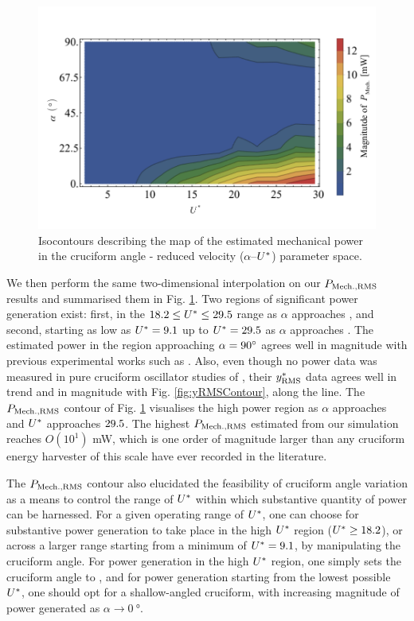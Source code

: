 \documentclass[oneside]{utmthesis}
\begin{document}
\begin{figure}
  \centering
  \includegraphics[width=1\textwidth]{figs/mechanicalPowerContours}
  \caption{Isocontours describing the map of the estimated mechanical power in the cruciform angle - reduced velocity ($\alpha$--$U^{*}$) parameter space.}
  \label{fig:mechanicalPowerContour}
\end{figure}

We then perform the same two-dimensional interpolation on our $P_{\text{Mech.,RMS}}$ results and summarised them in Fig. \ref{fig:mechanicalPowerContour}. Two regions of significant power generation exist: first, in the $18.2 \leq U^{*} \leq 29.5$ range as $\alpha$ approaches \angfi{}, and second, starting as low as $U^{*} = 9.1$ up to $U^{*} = 29.5$ as $\alpha$ approaches \angon{}. The estimated power in the region approaching $\alpha = \angfi{}$ agrees well in magnitude with previous experimental works such as \citet{Koide2013}. Also, even though no power data was measured in pure cruciform oscillator studies of \citet{Koide2009,Nguyen2012}, their $y^{*}_{\text{RMS}}$ data agrees well in trend and in magnitude with Fig. \ref{fig:yRMSContour}, along the \angfi{} line. The $P_{\text{Mech.,RMS}}$ contour of Fig. \ref{fig:mechanicalPowerContour} visualises the high power region as $\alpha$ approaches \angon{} and $U^{*}$ approaches $29.5$. The highest $P_{\text{Mech.,RMS}}$ estimated from our simulation reaches $O(10^{1})$ \si{\milli\watt}, which is one order of magnitude larger than any cruciform energy harvester of this scale have ever recorded in the literature.

The $P_{\text{Mech.,RMS}}$ contour also elucidated the feasibility of cruciform angle variation as a means to control the range of $U^{*}$ within which substantive quantity of power can be harnessed. For a given operating range of $U^{*}$, one can choose for substantive power generation to take place in the high $U^{*}$ region ($U^{*} \geq 18.2$), or across a larger range starting from a minimum of $U^{*} = 9.1$, by manipulating the cruciform angle. For power generation in the high $U^{*}$ region, one simply sets the cruciform angle to \angfi{}, and for power generation starting from the lowest possible $U^{*}$, one should opt for a shallow-angled cruciform, with increasing magnitude of power generated as $\alpha \rightarrow \SI{0}{\degree}$.
\end{document}
